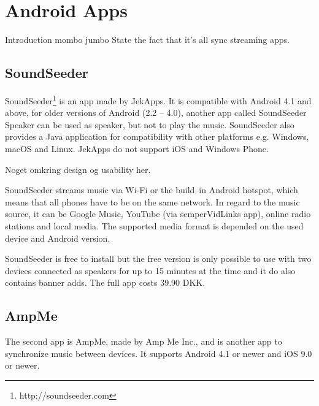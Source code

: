 \section{Android Apps}
Introduction mombo jumbo
State the fact that it's all sync streaming apps.

\subsection{SoundSeeder}
SoundSeeder\footnote{http://soundseeder.com} is an app made by JekApps. 
It is compatible with Android 4.1 and above, for older versions of Android (2.2 -- 4.0),
another app called SoundSeeder Speaker can be used as speaker, but not to play the music.
SoundSeeder also provides a Java application for compatibility with other platforms e.g. Windows, macOS and Linux.
JekApps do not support iOS and Windows Phone\cite{soundseeder_ios}.

Noget omkring design og usability her.

SoundSeeder streams music via Wi-Fi or the build--in Android hotspot\cite{soundseether_faq}, 
which means that all phones have to be on the same network.
In regard to the music source, it can be Google Music, YouTube (via semperVidLinks app), online radio stations and local media.
The supported media format is depended on the used device and Android version.\cite{soundseether_faq}

SoundSeeder is free to install but the free version is only possible to use with two devices connected as speakers for up to 15 minutes at the time and it do also contains banner adds. 
The full app costs 39.90 DKK. 

\iffalse
3.9 stars on Google Play
Functionality / How good it works
11. november 2016 https://play.google.com/store/apps/details?id=com.kattwinkel.android.soundseeder.player
For Android > 4.1 and Java based devices (RPI, Linux, Windows, macOS etc.), no plans for iOS and Windows Phone http://soundseeder.com/support/topic/ios-and-windows-support-soon/
Google Music, YouTube (via semperVidLinks app), online radiostations, 
Steam music via Wi-Fi or portable hotspot, UPnP/DLNA browser, mp3, mp4, m4a, aac, 3gp, ogg, flac (depends on your device / android version)
Free version: two speaksers for up to 15 min as often you want, it contains banner adds. Priced version: 39,90 DKK
Sync settings: ?
\fi

\subsection{AmpMe}
The second app is AmpMe, made by Amp Me Inc., and is another app to synchronize music between devices.
It supports Android 4.1 or newer and iOS 9.0 or newer.

